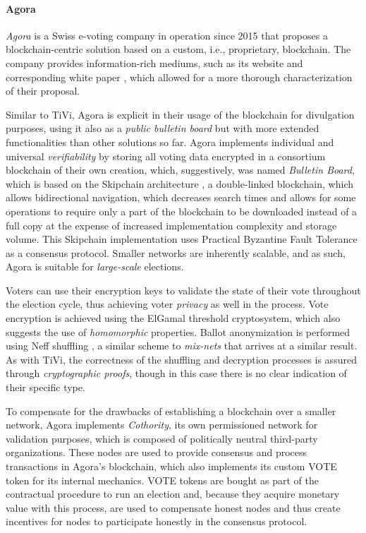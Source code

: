 \documentclass[../access.tex]{subfiles}
\begin{document}
	\paragraph{Agora \cite{Agora2021}}
        \textit{Agora} is a Swiss e-voting company in operation since 2015 that proposes a blockchain-centric solution based on a custom, i.e., proprietary, blockchain. The company provides information-rich mediums, such as its website \cite{Agora2021} and corresponding white paper \cite{AgoraWhitePaper2021}, which allowed for a more thorough characterization of their proposal.
		\par
        Similar to TiVi, Agora is explicit in their usage of the blockchain for divulgation purposes, using it also as a \textit{public bulletin board} but with more extended functionalities than other solutions so far. Agora implements individual and universal \textit{verifiability} by storing all voting data encrypted in a consortium blockchain of their own creation, which, suggestively, was named \textit{Bulletin Board}, which is based on the Skipchain architecture \cite{Nikitin2017}, a double-linked blockchain, which allows bidirectional navigation, which decreases search times and allows for some operations to require only a part of the blockchain to be downloaded instead of a full copy at the expense of increased implementation complexity and storage volume. This Skipchain implementation uses Practical Byzantine Fault Tolerance as a consensus protocol. Smaller networks are inherently scalable, and as such, Agora is suitable for \textit{large-scale} elections.
		\par
		Voters can use their encryption keys to validate the state of their vote throughout the election cycle, thus achieving voter \textit{privacy} as well in the process. Vote encryption is achieved using the ElGamal threshold cryptosystem, which also suggests the use of \textit{homomorphic} properties. Ballot anonymization is performed using Neff shuffling \cite{Neff2001}, a similar scheme to \textit{mix-nets} that arrives at a similar result. As with TiVi, the correctness of the shuffling and decryption processes is assured through \textit{cryptographic proofs}, though in this case there is no clear indication of their specific type.
		\par
        To compensate for the drawbacks of establishing a blockchain over a smaller network, Agora implements \textit{Cothority}, its own permissioned network for validation purposes, which is composed of politically neutral third-party organizations. These nodes are used to provide consensus and process transactions in Agora's blockchain, which also implements its custom VOTE token for its internal mechanics. VOTE tokens are bought as part of the contractual procedure to run an election and, because they acquire monetary value with this process, are used to compensate honest nodes and thus create incentives for nodes to participate honestly in the consensus protocol.
\end{document}
